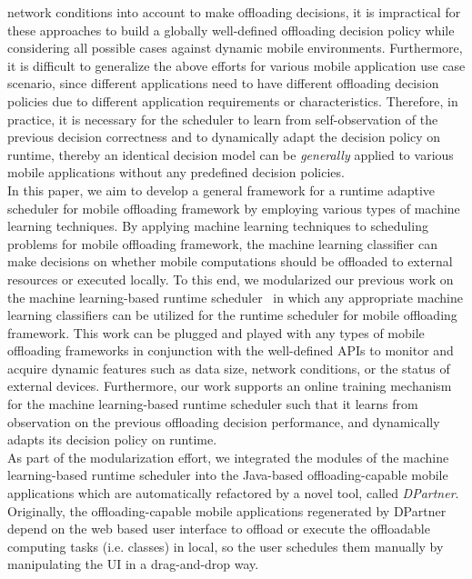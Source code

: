 \documentclass[10pt, conference, compsocconf]{IEEEtran}
\begin{document}
network conditions into account to make offloading decisions, it is
impractical for these approaches to build a globally well-defined
offloading decision policy while considering all possible cases against
dynamic mobile environments.
%
Furthermore, it is difficult to generalize the above efforts for various
mobile application use case scenario, since different applications need
to have different offloading decision policies due to different
application requirements or characteristics.
%
Therefore, in practice, it is necessary for the scheduler to learn
from self-observation of the previous decision correctness and to
dynamically adapt the decision policy on runtime, thereby an identical
decision model can be \textit{generally} applied to various mobile
applications without any predefined decision policies.\\
%
\indent In this paper, we aim to develop a general framework for a
runtime adaptive scheduler for mobile offloading framework by
employing various types of machine learning techniques.
%
By applying machine learning techniques to scheduling problems
for mobile offloading framework, the machine learning classifier can
make decisions on whether mobile computations should be offloaded to
external resources or executed locally.
%
To this end, we modularized our previous work on the machine
learning-based runtime scheduler~\cite{ml} in which any appropriate
machine learning classifiers can be utilized for the runtime scheduler
for mobile offloading framework.
%
This work can be plugged and played with any types of mobile offloading
frameworks in conjunction with the well-defined APIs to monitor and
acquire dynamic features such as data size, network conditions, or the
status of external devices. 
%
Furthermore, our work supports an online training mechanism for
the machine learning-based runtime scheduler such that it learns from
observation on the previous offloading decision performance, and
dynamically adapts its decision policy on runtime.\\
%
\indent As part of the modularization effort, we integrated the
modules of the machine learning-based runtime scheduler into the Java-based
offloading-capable mobile applications which are automatically
refactored by a novel tool, called \textit{DPartner}.
%
Originally, the offloading-capable mobile applications regenerated by
DPartner depend on the web based user interface to offload or execute
the offloadable computing tasks (i.e. classes) in local, so the user
schedules them manually by manipulating the UI in a drag-and-drop way.  
\end{document}
